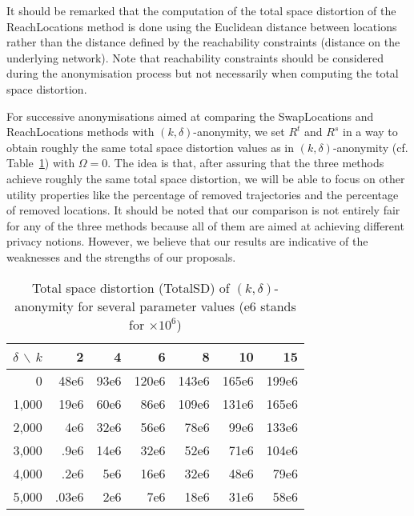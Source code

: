 It should be remarked that the computation of the total space distortion
of the ReachLocations method is done using the Euclidean distance
between locations rather than the distance defined by the
reachability constraints (distance on the underlying network).
Note that reachability constraints should be considered during
the anonymisation process but not necessarily when computing
the total space distortion.

For successive anonymisations aimed at comparing the
SwapLocations and ReachLocations methods with $(k,\delta)$-anonymity,
we set $R^t$ and $R^s$ in a way to obtain roughly the same
total space distortion values as in $(k, \delta)$-anonymity
(cf. Table~\ref{tab:totalsd}) with $\Omega = 0$.
The idea is that, after assuring that the three methods achieve
roughly the same total space distortion,
we will be able to focus on other utility properties
like the percentage of removed trajectories
and the percentage of removed locations. It should be
noted that our comparison is not entirely fair for any of
the three methods because all of them are aimed at achieving
different privacy notions. However, we believe that our
results are indicative of the weaknesses and the strengths of
our proposals.

\begin{table}[!ht]
\centering
\begin{tabular}{|r|r|r|r|r|r|r|}
\hline
$\delta$ $\backslash$ $k$ & 2 & 4 & 6 & 8 & 10 & 15 \\
\hline
0 & 48e6 & 93e6 & 120e6 & 143e6 & 165e6 & 199e6 \\
1,000 & 19e6 & 60e6 & 86e6 & 109e6 & 131e6 & 165e6 \\
2,000 & 4e6 & 32e6 & 56e6 & 78e6 & 99e6 & 133e6 \\
3,000 & .9e6 & 14e6 & 32e6 & 52e6 & 71e6 & 104e6 \\
4,000 & .2e6 & 5e6 & 16e6 & 32e6 & 48e6 & 79e6 \\
5,000 & .03e6 & 2e6 & 7e6 & 18e6 & 31e6 & 58e6 \\
\hline
\end{tabular}
\caption{Total space distortion (TotalSD) of $(k, \delta)$-anonymity
for several parameter values (e6 stands for $\times 10^6$)}
\label{tab:totalsd}
\end{table}


